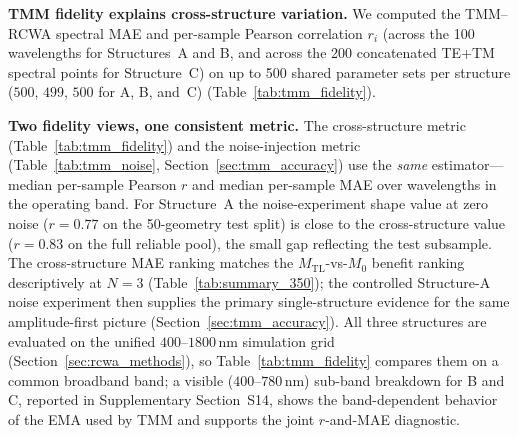 \documentclass[a4paper,fleqn]{cas-sc}
\newcommand{\Mzero}{M_0}
\newcommand{\Mtl}{M_\text{TL}}
\begin{document}
\textbf{TMM fidelity explains cross-structure variation.} We computed the TMM--RCWA spectral MAE and per-sample Pearson correlation $r_i$ (across the 100 wavelengths for Structures~A and B, and across the 200 concatenated TE+TM spectral points for Structure~C) on up to 500 shared parameter sets per structure ($500$, $499$, $500$ for A, B, and~C) (Table~\ref{tab:tmm_fidelity}).

\textbf{Two fidelity views, one consistent metric.} The cross-structure metric (Table~\ref{tab:tmm_fidelity}) and the noise-injection metric (Table~\ref{tab:tmm_noise}, Section~\ref{sec:tmm_accuracy}) use the \emph{same} estimator---median per-sample Pearson $r$ and median per-sample MAE over wavelengths in the operating band. For Structure~A the noise-experiment shape value at zero noise ($r=0.77$ on the 50-geometry test split) is close to the cross-structure value ($r=0.83$ on the full reliable pool), the small gap reflecting the test subsample. The cross-structure MAE ranking matches the $\Mtl$-vs-$\Mzero$ benefit ranking descriptively at $N=3$ (Table~\ref{tab:summary_350}); the controlled Structure-A noise experiment then supplies the primary single-structure evidence for the same amplitude-first picture (Section~\ref{sec:tmm_accuracy}). All three structures are evaluated on the unified $400$--$1800$\,nm simulation grid (Section~\ref{sec:rcwa_methods}), so Table~\ref{tab:tmm_fidelity} compares them on a common broadband band; a visible ($400$--$780$\,nm) sub-band breakdown for B and C, reported in Supplementary Section~S14, shows the band-dependent behavior of the EMA used by TMM and supports the joint $r$-and-MAE diagnostic.
\end{document}
